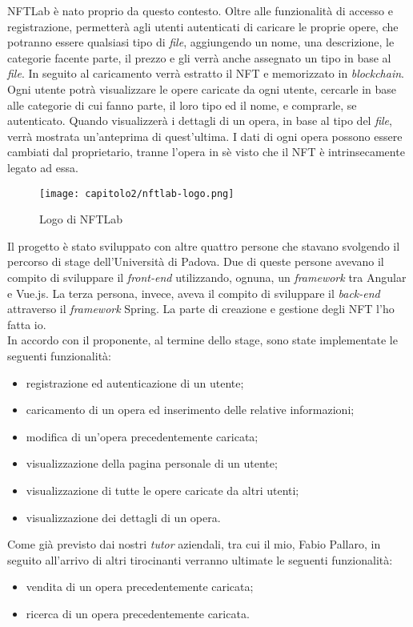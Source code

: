 NFTLab è nato proprio da questo contesto. Oltre alle funzionalità di accesso e registrazione, permetterà agli utenti autenticati di caricare le proprie opere, che potranno essere qualsiasi tipo di \textit{file}, aggiungendo un nome, una descrizione, le categorie facente parte, il prezzo e gli verrà anche assegnato un tipo in base al \textit{file}. In seguito al caricamento verrà estratto il NFT e memorizzato in \textit{blockchain}. 
Ogni utente potrà visualizzare le opere caricate da ogni utente, cercarle in base alle categorie di cui fanno parte, il loro tipo ed il nome, e comprarle, se autenticato. Quando visualizzerà i dettagli di un opera, in base al tipo del \textit{file}, verrà mostrata un'anteprima di quest'ultima.
I dati di ogni opera possono essere cambiati dal proprietario, tranne l'opera in sè visto che il NFT è intrinsecamente legato ad essa.

\begin{figure}[!h]
  \centering
  \texttt{[image: capitolo2/nftlab-logo.png]}
  \caption{Logo di NFTLab}
\end{figure}

Il progetto è stato sviluppato con altre quattro persone che stavano svolgendo il percorso di stage dell'Università di Padova. Due di queste persone avevano il compito di sviluppare il \textit{front-end} utilizzando, ognuna, un \textit{framework} tra Angular e Vue.js. La terza persona, invece, aveva il compito di sviluppare il \textit{back-end} attraverso il \textit{framework} Spring. La parte di creazione e gestione degli NFT l'ho fatta io. \\

\noindent In accordo con il proponente, al termine dello stage, sono state implementate le seguenti funzionalità:
\begin{itemize}
  \item registrazione ed autenticazione di un utente;
  \item caricamento di un opera ed inserimento delle relative informazioni;
  \item modifica di un'opera precedentemente caricata;
  \item visualizzazione della pagina personale di un utente;
  \item visualizzazione di tutte le opere caricate da altri utenti;
  \item visualizzazione dei dettagli di un opera.
\end{itemize}

\noindent Come già previsto dai nostri \textit{tutor} aziendali, tra cui il mio, Fabio Pallaro, in seguito all'arrivo di altri tirocinanti verranno ultimate le seguenti funzionalità:
\begin{itemize}
  \item vendita di un opera precedentemente caricata;
  \item ricerca di un opera precedentemente caricata.
\end{itemize}

